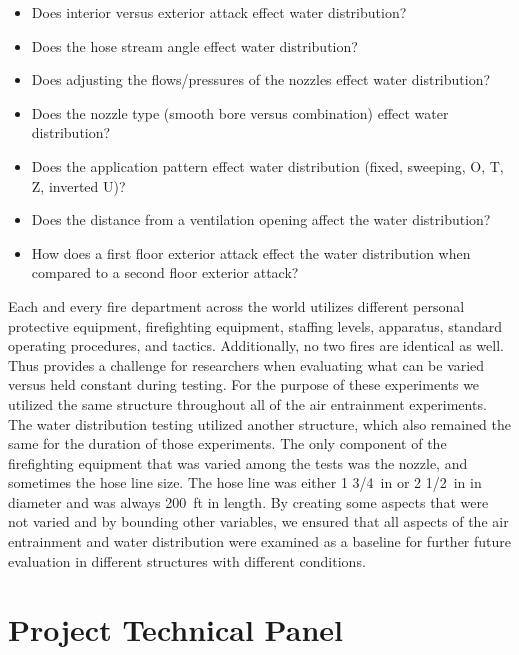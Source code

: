 \documentclass{article}
\begin{document}
\begin{itemize}
	\item Does interior versus exterior attack effect water distribution?
	\item Does the hose stream angle effect water distribution?
	\item Does adjusting the flows/pressures of the nozzles effect water distribution? 
	\item Does the nozzle type (smooth bore versus combination) effect water distribution? 
	\item Does the application pattern effect water distribution (fixed, sweeping, O, T, Z, inverted U)?
	\item Does the distance from a ventilation opening affect the water distribution?
	\item How does a first floor exterior attack effect the water distribution when compared to a second floor exterior attack?
\end{itemize}

Each and every fire department across the world utilizes different personal protective equipment, firefighting equipment, staffing levels, apparatus, standard operating procedures, and tactics. Additionally, no two fires are identical as well. Thus provides a challenge for researchers when evaluating what can be varied versus held constant during testing. For the purpose of these experiments we utilized the same structure throughout all of the air entrainment experiments. The water distribution testing utilized another structure, which also remained the same for the duration of those experiments. The only component of the firefighting equipment that was varied among the tests was the nozzle, and sometimes the hose line size. The hose line was either 1 3/4~in or 2 1/2~in in diameter and was always 200~ft in length. By creating some aspects that were not varied and by bounding other variables, we ensured that all aspects of the air entrainment and water distribution were examined as a baseline for further future evaluation in different structures with different conditions.

\clearpage

\section{Project Technical Panel}
\end{document}
